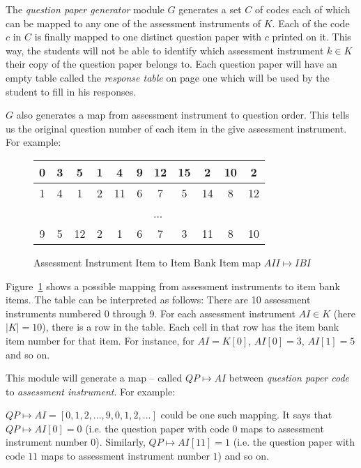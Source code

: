 \documentclass[12pt]{report}
\begin{document}
The \emph{question paper generator} module $G$ generates a set $C$ of codes each of which can be mapped to any one of the assessment instruments of $K$. Each of the code $c$ in $C$ is finally mapped to one distinct question paper with $c$ printed on it. This way, the students will not be able to identify which assessment instrument $k \in K$ their copy of the question paper belongs to. Each question paper will have an empty table called the \emph{response table} on page one which will be used by the student to fill in his responses.

$G$ also generates a map from assessment instrument to question order. This tells us the original question number of each item in the give assessment instrument. For example:
\begin{figure}

\begin{center}
\begin{tabular}{|c|c|c|c|c|c|c|c|c|c|c|}
\hline
\cellcolor{Gray}0 & 3 & 5 & 1 & 4 & 9 & 12 & 15 & 2 & 10 & 2 \\
\hline
\cellcolor{Gray}1 & 4 & 1 & 2 & 11 & 6 & 7 & 5 & 14 & 8 & 12 \\
\hline
& \multicolumn{10}{|c|}{...} \\
\hline
\cellcolor{Gray}9 & 5 & 12 & 2 & 1 & 6 & 7 & 3 & 11 & 8 & 10 \\
\hline
\end{tabular}
\end{center}

\caption{Assessment Instrument Item to Item Bank Item map $AII \mapsto IBI$}
\label{f:aiiibi} 
\end{figure}

Figure~\ref{f:aiiibi} shows a possible mapping from assessment instruments to item bank items. The table can be interpreted as follows: There are 10 assessment instruments numbered 0 through 9. For each assessment instrument $AI \in K$ (here $|K| = 10$), there is a row in the table. Each cell in that row has the item bank item number for that item. For instance, for $AI = K[0]$, $AI[0] = 3$, $AI[1] = 5$ and so on.
  
This module will generate a map -- called $QP\mapsto AI$ between \emph{question paper code} to \emph{assessment instrument}. For example:

$QP\mapsto AI = [0, 1, 2, ..., 9, 0, 1, 2, ...]$ could be one such mapping. It says that $QP\mapsto AI[0] = 0$ (i.e. the question paper with code $0$ maps to assessment instrument number $0$). Similarly, $QP\mapsto AI[11] = 1$ (i.e. the question paper with code $11$ maps to assessment instrument number $1$) and so on.
\end{document}
